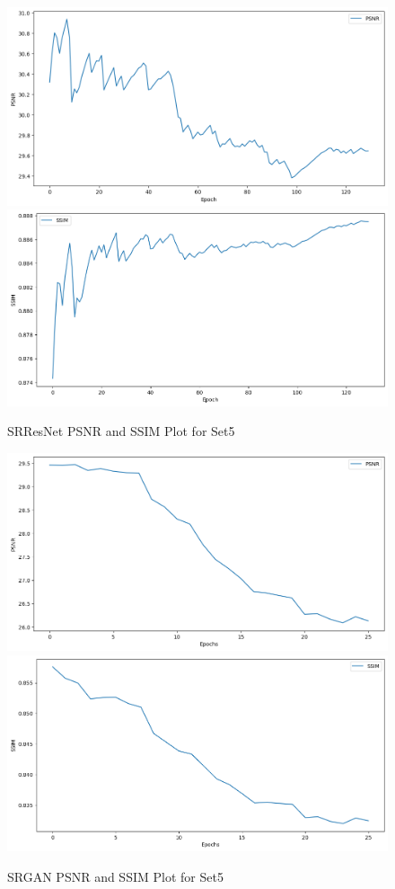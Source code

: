 \begin{figure}[ht]
    \centering
    \includegraphics[width=6in]{./figures/srresnet_psnr.png}
    \includegraphics[width=6in]{./figures/srresnnet_ssim.png}
    \caption{SRResNet PSNR and SSIM Plot for Set5}
\end{figure}  
\newpage
\begin{figure}[ht]
    \centering
    \includegraphics[width=6in]{./figures/srgan_psnr.png}
    \includegraphics[width=6in]{./figures/srgan_ssim.png}
    \caption{SRGAN PSNR and SSIM Plot for Set5}
\end{figure} 
